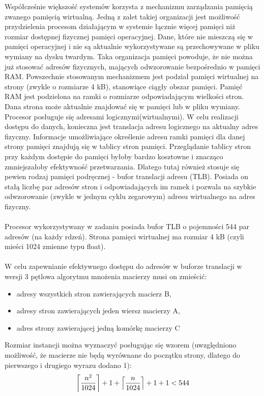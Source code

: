 \documentclass[12pt,a4paper]{article}
\DeclarePairedDelimiter\ceil{\lceil}{\rceil}
\begin{document}
Współcześnie większość systemów korzysta z mechanizmu zarządzania pamięcią zwanego pamięcią wirtualną. Jedną z zalet takiej organizacji jest możliwość przydzielenia procesom działającym w systemie łącznie więcej pamięci niż rozmiar dostępnej fizycznej pamięci operacyjnej. Dane, które nie mieszczą się w pamięci operacyjnej i nie są aktualnie wykorzystywane są przechowywane w pliku wymiany na dysku twardym. Taka organizacja pamięci powoduje, że nie można już stosować adresów fizycznych, mających odwzorowanie bezpośrednio w pamięci RAM. Powszechnie stosowanym mechanizmem jest podział pamięci wirtualnej na strony (zwykle o rozmiarze 4 kB), stanowiące ciągły obszar pamięci. Pamięć RAM jest podzielona na ramki o rozmiarze odpowiadającym wielkości stron. Dana strona może aktualnie znajdować się w pamięci lub w pliku wymiany. Procesor posługuje się adresami logicznymi(wirtualnymi). W celu realizacji dostępu do danych, konieczna jest translacja adresu logicznego na aktualny adres fizyczny. Informacje umożliwiające określenie adresu ramki pamięci dla danej strony pamięci znajdują się w tablicy stron pamięci. Przeglądanie tablicy stron przy każdym dostępie do pamięci byłoby bardzo kosztowne i znacząco zmniejszałoby efektywność przetwarzania. Dlatego tutaj również stosuje się pewien rodzaj pamięci podręcznej - bufor translacji adresu (TLB). Posiada on stałą liczbę par adresów stron i odpowiadających im ramek i pozwala na szybkie odwzorowanie (zwykle w jednym cyklu zegarowym) adresu wirtualnego na adres fizyczny.\\
\\
Procesor wykorzystywany w zadaniu posiada bufor TLB o pojemności 544 par adresów (na każdy rdzeń). Strona pamięci wirtualnej ma rozmiar 4 kB (czyli mieści 1024 zmienne typu float).\\
\\
W celu zapewnianie efektywnego dostępu do adresów w buforze translacji w wersji 3 pętlowa algorytmu mnożenia macierzy musi on zmieścić:
\begin{itemize}
\item adresy wszystkich stron zawierających macierz B,
\item adresy stron zawierających jeden wiersz macierzy A,
\item adres strony zawierającej jedną komórkę macierzy C
\end{itemize}

Rozmiar instancji można wyznaczyć posługując się wzorem (uwzględniono możliwość, że macierze nie będą wyrównane do początku strony, dlatego do pierwszego i drugiego wyrazu dodano 1):
\begin{equation}
\ceil*{\frac{n^2}{1024}} + 1 + \ceil*{\frac{n}{1024}} + 1 + 1 < 544
\end{equation}
\end{document}
